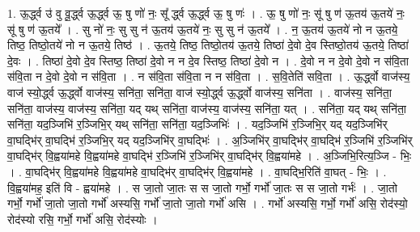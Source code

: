 \documentclass[17pt]{extarticle}
\begin{document}
1. ऊ॒र्द्ध्व उ॑ वु वू॒र्द्ध्व ऊ॒र्द्ध्व ऊ॒ षु णो॑ नः॒ सू᳚ र्द्ध्व ऊ॒र्द्ध्व ऊ॒ षु णः॑ । . ऊ॒ षु णो॑ नः॒ सू॑ षु ण॑ ऊ॒तय॑ ऊ॒तये॑ नः॒ सू॑ षु ण॑ ऊ॒तये᳚ । . सु नो॑ नः॒ सु सु न॑ ऊ॒तय॑ ऊ॒तये॑ नः॒ सु सु न॑ ऊ॒तये᳚ । . न॒ ऊ॒तय॑ ऊ॒तये॑ नो न ऊ॒तये॒ तिष्ठ॒ तिष्ठो॒तये॑ नो न ऊ॒तये॒ तिष्ठ॑ । . ऊ॒तये॒ तिष्ठ॒ तिष्ठो॒तय॑ ऊ॒तये॒ तिष्ठा॑ दे॒वो दे॒व स्तिष्ठो॒तय॑ ऊ॒तये॒ तिष्ठा॑ दे॒वः । . तिष्ठा॑ दे॒वो दे॒व स्तिष्ठ॒ तिष्ठा॑ दे॒वो न न दे॒व स्तिष्ठ॒ तिष्ठा॑ दे॒वो न । . दे॒वो न न दे॒वो दे॒वो न स॑वि॒ता स॑वि॒ता न दे॒वो दे॒वो न स॑वि॒ता । . न स॑वि॒ता स॑वि॒ता न न स॑वि॒ता । . स॒वि॒तेति॑ सवि॒ता । . ऊ॒र्द्ध्वो वाज॑स्य॒ वाज॑ स्यो॒र्द्ध्व ऊ॒र्द्ध्वो वाज॑स्य॒ सनि॑ता॒ सनि॑ता॒ वाज॑ स्यो॒र्द्ध्व ऊ॒र्द्ध्वो वाज॑स्य॒ सनि॑ता । . वाज॑स्य॒ सनि॑ता॒ सनि॑ता॒ वाज॑स्य॒ वाज॑स्य॒ सनि॑ता॒ यद् यथ् सनि॑ता॒ वाज॑स्य॒ वाज॑स्य॒ सनि॑ता॒ यत् । . सनि॑ता॒ यद् यथ् सनि॑ता॒ सनि॑ता॒ यद॒ञ्जिभि॑ र॒ञ्जिभि॒र् यथ् सनि॑ता॒ सनि॑ता॒ यद॒ञ्जिभिः॑ । . यद॒ञ्जिभि॑ र॒ञ्जिभि॒र् यद् यद॒ञ्जिभि॑र् वा॒घद्भि॑र् वा॒घद्भि॑ र॒ञ्जिभि॒र् यद् यद॒ञ्जिभि॑र् वा॒घद्भिः॑ । . अ॒ञ्जिभि॑र् वा॒घद्भि॑र् वा॒घद्भि॑ र॒ञ्जिभि॑ र॒ञ्जिभि॑र् वा॒घद्भि॑र् वि॒ह्वया॑महे वि॒ह्वया॑महे वा॒घद्भि॑ र॒ञ्जिभि॑ र॒ञ्जिभि॑र् वा॒घद्भि॑र् वि॒ह्वया॑महे । . अ॒ञ्जिभि॒रित्य॒ञ्जि - भिः॒ । . वा॒घद्भि॑र् वि॒ह्वया॑महे वि॒ह्वया॑महे वा॒घद्भि॑र् वा॒घद्भि॑र् वि॒ह्वया॑महे । . वा॒घद्भि॒रिति॑ वा॒घत् - भिः॒ । . वि॒ह्वया॑मह॒ इति॑ वि - ह्वया॑महे । . स जा॒तो जा॒तः स स जा॒तो गर्भो॒ गर्भो॑ जा॒तः स स जा॒तो गर्भः॑ । . जा॒तो गर्भो॒ गर्भो॑ जा॒तो जा॒तो गर्भो॑ अस्यसि॒ गर्भो॑ जा॒तो जा॒तो गर्भो॑ असि । . गर्भो॑ अस्यसि॒ गर्भो॒ गर्भो॑ असि॒ रोद॑स्यो॒ रोद॑स्यो रसि॒ गर्भो॒ गर्भो॑ असि॒ रोद॑स्योः । \newline
\end{document}
